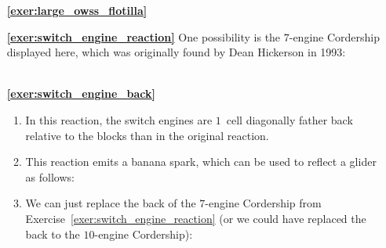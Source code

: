\begin{multicols}{2}
\begin{itemize}[leftmargin=0em]
		
		
		\item[\bf\color{ocre}\sffamily\ref{exer:large_owss_flotilla}]  \\
		
		
		\item[\bf\color{ocre}\sffamily\ref{exer:switch_engine_reaction}] One possibility is the $7$-engine Cordership displayed here, which was originally found by Dean Hickerson in 1993: \\[-0.6em]
		
		 \\
		
		
		\item[\bf\color{ocre}\sffamily\ref{exer:switch_engine_back}]
		\begin{enumerate}[leftmargin=1.5em,label=\bf\color{ocre}(\alph*)]
			\item In this reaction, the switch engines are $1$~cell diagonally father back relative to the blocks than in the original reaction.
			
			\item This reaction emits a banana spark, which can be used to reflect a glider as follows: \\[-0.6em]
			
			
			\item We can just replace the back of the $7$-engine Cordership from Exercise~\ref{exer:switch_engine_reaction} (or we could have replaced the back to the $10$-engine Cordership): \\[-0.6em]
			

\end{enumerate}
\end{itemize}
\end{multicols}
